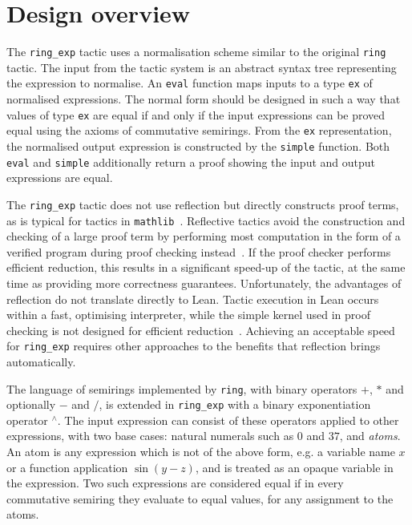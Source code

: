 \documentclass{llncs}
\newcommand{\lean}[1]{\texttt{#1}\xspace} %
\newcommand{\mathlib}{\texttt{mathlib}\xspace}
\newcommand{\pow}{{${}^\wedge$}\xspace}
\newcommand{\ring}{\lean{ring}}
\newcommand{\ringexp}{\lean{ring\_exp}}
\begin{document}
\section{Design overview}

The \ringexp tactic uses a normalisation scheme similar to the original \ring tactic.
The input from the tactic system is an abstract syntax tree representing the expression to normalise.
An \lean{eval} function maps inputs to a type \lean{ex} of normalised expressions.
The normal form should be designed in such a way that values of type \lean{ex} are equal
if and only if the input expressions can be proved equal using the axioms of commutative semirings.
From the \lean{ex} representation, the normalised output expression is constructed by the \lean{simple} function.
Both \lean{eval} and \lean{simple} additionally return a proof showing the input and output expressions are equal.

The \ringexp tactic does not use reflection but directly constructs proof terms,
as is typical for tactics in \mathlib~\cite{mathlib}.
Reflective tactics avoid the construction and checking of a large proof term
by performing most computation in the form of a verified program during proof checking instead~\cite{reflection-tactics}.
If the proof checker performs efficient reduction, this results in a significant speed-up of the tactic,
at the same time as providing more correctness guarantees.
Unfortunately, the advantages of reflection do not translate directly to Lean.
Tactic execution in Lean occurs within a fast, optimising interpreter,
while the simple kernel used in proof checking is not designed for efficient reduction~\cite{lean-tactics}.
Achieving an acceptable speed for \ringexp requires other approaches to the benefits that reflection brings automatically.

The language of semirings implemented by \ring, with binary operators $+$, $*$ and optionally $-$ and $/$,
is extended in \ringexp with a binary exponentiation operator \pow.
The input expression can consist of these operators applied to other expressions,
with two base cases: natural numerals such as $0$ and $37$, and \emph{atoms}.
An atom is any expression which is not of the above form, e.g. a variable name $x$ or a function application $\sin (y - z)$,
and is treated as an opaque variable in the expression.
Two such expressions are considered equal if in every commutative semiring they evaluate to equal values, for any assignment to the atoms.
\end{document}
